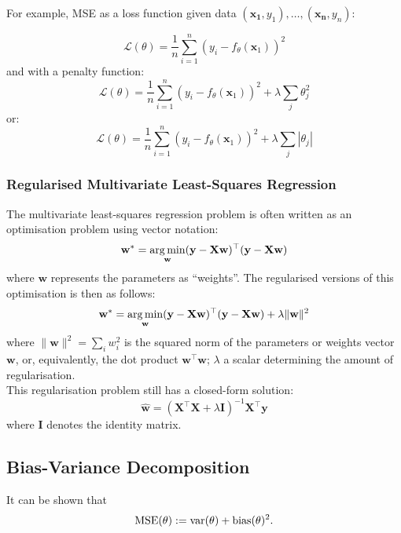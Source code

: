 For example, MSE as a loss function given data \((\mathbf{x_1}, y_1), \dots, (\mathbf{x_n}, y_n)\):

\[\mathcal{L}(\theta) = \frac{1}{n}\sum_{i = 1}^n (y_i - f_\theta(\mathbf{x}_1))^2\]
and with a penalty function:
\[\mathcal{L}(\theta) = \frac{1}{n}\sum_{i = 1}^n (y_i - f_\theta(\mathbf{x}_1))^2 + \lambda\sum_j \theta_j^2\]
or:
\[\mathcal{L}(\theta) = \frac{1}{n}\sum_{i = 1}^n (y_i - f_\theta(\mathbf{x}_1))^2 + \lambda\sum_j |\theta_j|\]

\subsubsection{Regularised Multivariate Least-Squares Regression}

The multivariate least-squares regression problem is often written as an optimisation problem using vector notation:
\[\mathbf{w}^* = \operatorname*{arg\,min}_{\mathbf{w}} (\mathbf{y} - \mathbf{Xw})^\top(\mathbf{y} - \mathbf{Xw})\]
where \(\mathbf{w}\) represents the parameters as ``weights''. The regularised versions of this optimisation is then as follows:
\[\mathbf{w}^* = \operatorname*{arg\,min}_{\mathbf{w}} (\mathbf{y} - \mathbf{Xw})^\top(\mathbf{y} - \mathbf{Xw}) + \lambda\lVert\mathbf{w}\rVert^2\]
where \(\lVert\mathbf{w}\rVert^2 = \sum_i w_i^2\) is the squared norm of the parameters or weights vector \(\mathbf{w}\), or, equivalently, the dot product \(\mathbf{w}^\top \mathbf{w}\); \(\lambda\) a scalar determining the amount of regularisation. \\

This regularisation problem still has a closed-form solution:
\[\hat{\mathbf{w}} = (\mathbf{X}^\top \mathbf{X} + \lambda \mathbf{I})^{-1}\mathbf{X}^\top \mathbf{y}\]
where \(\mathbf{I}\) denotes the identity matrix.

\subsection{Bias-Variance Decomposition}

It can be shown that
\[\operatorname{MSE}(\theta) := \operatorname{var}(\theta) + \operatorname*{bias}(\theta)^2.\]